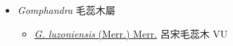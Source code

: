 
  \begin{itemize}
 \item[] \textit{Gomphandra} 毛蕊木屬
                                
  \begin{itemize}
        \item[] \href{http://www.theplantlist.org/tpl1.1/search?q=Gomphandra+luzoniensis}{\textit{G. luzoniensis} (Merr.) Merr.}   呂宋毛蕊木   VU
  \end{itemize}
  \end{itemize}
